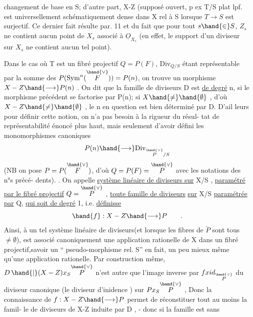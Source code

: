 changement de base en S; d'autre part, X-Z (supposé ouvert, p ex T/S plat lpf. est universellement
schématiquement dense dans X rel à S lorsque $T \to S$ est surjectif\unsure{)}. Ce dernier fait résulte  %
 par. 11 et du fait que pour tout $s \hand{\in} S$,
$Z_s$ ne contient aucun point de $X_s$ associé à $\underline{O}_{X_s}$ (en effet, le support d'un
diviseur  sur $X_s$ ne contient aucun tel point).

Dans le cas où T est un fibré projectif $Q=P(F)$, $\mathrm{Div}_{Q/S}$
étant représentable par la somme des $P(\mathrm{Sym}^n(\overset{\hand{\vee}}{F})) = P(n)$, on trouve
un morphisme $X-Z \hand{\longrightarrow} P(n)$ . On dit que la famille de diviseurs
D est \uline{de degré} n, si le morphisme précédent se factorise par P(n); si
$X \hand{\neq} \hand{\emptyset}$ , d'où $X-Z \hand{\neq} \hand{\emptyset}$ , le n en question est bien déterminé par D. D'ail%
leurs pour définir cette notion, on n'a pas besoin à la rigueur du résul-%
tat de représentabilité énoncé plus haut, mais seulement d'avoir défini
les monomorphismes canoniques
\[ P(n) \hand{\longrightarrow} \mathrm{Div}_{\overset{\hand{\vee}}{P}/S} \]
(NB on pose $P = P(\overset{\hand{\vee}}{F})$, d'où $Q = P(F) = \overset{\hand{\vee}}{P}$ avec les notations des n°s précé-%
dents). . On appelle \uline{système linéaire de diviseurs sur} X/S , \uline{paramétré
par le fibré projectif} $Q = \overset{\hand{\vee}}{P}$ , \uline{toute famille de diviseurs} \uline{sur} X/S
\uline{paramétrée par} Q, \uline{qui soit de degré} 1, i.e. \uline{définisse}
\[ \hand{f} : X-Z \hand{\longrightarrow} P \qquad . \]
Ainsi, à un tel système  linéaire de diviseurs(et lorsque les fibres de $\check{P}$ sont tous $\neq \emptyset$), est associé canoniquement
une application rationelle de X dans un fibré projectif,savoir un `` pseudo-morphisme rel. S'' \hand{(}en fait, un peu
mieux même qu'une application rationelle\hand{)}. Par construction même,
$D\,\hand{|}(X-Z)x_S\overset{\hand{\vee}}{P}$ n'est autre que l'image inverse par $f x id_{\overset{\hand{\vee}}{P}}$ du diviseur
canonique (le diviseur d'inidence ) sur $Px_S\overset{\hand{\vee}}{P}$ , Donc la connaissance
de $f: X-Z \hand{\longrightarrow} P$ permet de réconstituer  tout au moins la famil-%
le de diviseurs de X-Z induite par D , - donc si la famille est sans

